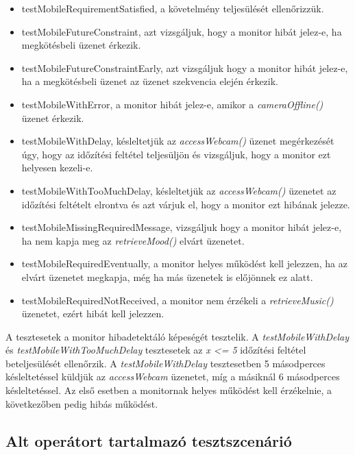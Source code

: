 \begin{itemize}
    \item testMobileRequirementSatisfied, a követelmény teljesülését ellenőrizzük.
    \item testMobileFutureConstraint, azt vizsgáljuk, hogy a monitor hibát jelez-e, ha megkötésbeli üzenet érkezik.
    \item testMobileFutureConstraintEarly, azt vizsgáljuk hogy a monitor hibát jelez-e, ha a megkötésbeli üzenet az üzenet szekvencia elején érkezik.
    \item testMobileWithError, a monitor hibát jelez-e, amikor a \textit{cameraOffline()} üzenet érkezik.
    \item testMobileWithDelay, késleltetjük az \textit{accessWebcam()} üzenet megérkezését úgy, hogy az időzítési feltétel teljesüljön és vizsgáljuk, hogy a monitor ezt helyesen kezeli-e.
    \item testMobileWithTooMuchDelay, késleltetjük az \textit{accessWebcam()} üzenetet  az időzítési feltételt elrontva és azt várjuk el, hogy a monitor ezt hibának jelezze.
    \item testMobileMissingRequiredMessage, vizsgáljuk hogy a monitor hibát jelez-e, ha nem kapja meg az \textit{retrieveMood()} elvárt üzenetet.
    \item testMobileRequiredEventually, a monitor helyes működést kell jelezzen, ha az elvárt üzenetet megkapja, még ha más üzenetek is előjönnek ez alatt.
    \item testMobileRequiredNotReceived, a monitor nem érzékeli a \textit{retrieveMusic()} üzenetet, ezért hibát kell jelezzen.
\end{itemize}

A tesztesetek a monitor hibadetektáló képeségét tesztelik.
A \textit{testMobileWithDelay} és \textit{testMobileWithTooMuchDelay} tesztesetek az \textit{x <= 5} időzítési feltétel beteljesülését ellenőrzik.
A \textit{testMobileWithDelay} tesztesetben 5 másodperces késleltetéssel küldjük az \textit{accessWebcam} üzenetet, míg a másiknál 6 másodperces késleltetéssel.
Az első esetben a monitornak helyes működést kell érzékelnie, a következőben pedig hibás működést.

\subsection{Alt operátort tartalmazó tesztszcenárió}

